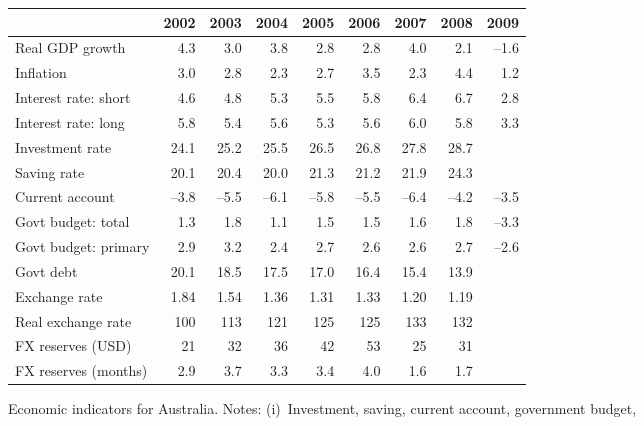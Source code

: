 \documentclass[letterpaper,12pt]{exam}
\begin{document}
\begin{questions}
\begin{solution}
\begin{parts}
\end{parts}
\end{solution}

%
\begin{center}
{\small
\begin{tabular}{lrrrrrrrr}%
\toprule
    & 2002 & 2003 & 2004 & 2005 & 2006 &  2007 &  2008 & 2009 \\%
\midrule
Real GDP growth  & 4.3 & 3.0 & 3.8 & 2.8 & 2.8 & 4.0 & 2.1
        & --1.6 \\
Inflation
        & 3.0 & 2.8 & 2.3 & 2.7 & 3.5 & 2.3 & 4.4 & 1.2 \\
Interest rate:  short
        & 4.6 & 4.8 & 5.3 & 5.5 & 5.8 & 6.4 & 6.7 & 2.8 \\
Interest rate:  long
        & 5.8 & 5.4 & 5.6 & 5.3 & 5.6 & 6.0 & 5.8 & 3.3 \\
Investment rate
        & 24.1 & 25.2 & 25.5 & 26.5 & 26.8 & 27.8 & 28.7 &  \\
Saving rate
        & 20.1 & 20.4 & 20.0 & 21.3 & 21.2 & 21.9 & 24.3 &  \\
Current account
        & --3.8 & --5.5 & --6.1 & --5.8 & --5.5
        & --6.4 & --4.2 & --3.5 \\
Govt budget:  total
        & 1.3 & 1.8 & 1.1 & 1.5 & 1.5 & 1.6 & 1.8 & --3.3 \\
Govt budget:  primary
        & 2.9 & 3.2 & 2.4 & 2.7 & 2.6 & 2.6 & 2.7 & --2.6 \\
Govt debt
        & 20.1 & 18.5 & 17.5 & 17.0 & 16.4 & 15.4 & 13.9  \\
Exchange rate
        & 1.84 & 1.54 & 1.36 & 1.31 & 1.33 & 1.20 & 1.19 \\
Real exchange rate
        & 100 &  113 & 121 & 125 & 125 & 133 & 132 \\
FX reserves (USD)
        & 21 & 32 & 36 & 42 & 53 & 25 & 31 & \\
FX reserves (months)
        &  2.9 & 3.7 & 3.3 & 3.4 & 4.0 & 1.6 & 1.7 \\
\bottomrule
\end{tabular}
}
\end{center}
{Economic indicators for Australia.
Notes:
(i)~Investment, saving, current account, government budget,
}
\end{questions}
\end{document}
